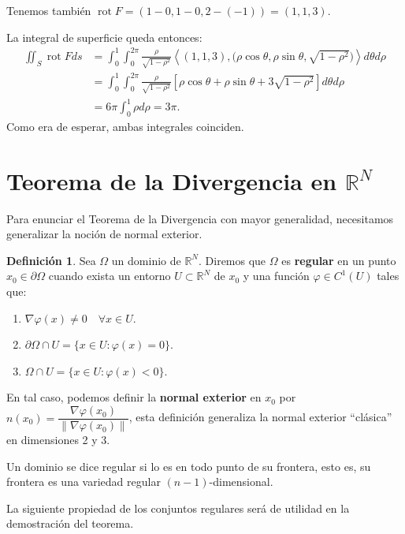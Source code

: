 \documentclass[12pt,spanish]{article}
\theoremstyle{definition}
\newtheorem{definition}[theorem]{Definici\'on}
\theoremstyle{remark}
\begin{document}
Tenemos también $\operatorname{rot} F=(1-0,1-0,2-(-1))=(1,1,3)$.

La integral de superficie queda entonces:
\begin{align*}
\iint_{S}\operatorname{rot} F ds&=\int_0^1\int_0^{2\pi}\frac{\rho}{\sqrt{1-\rho^2}}\left\langle(1,1,3),\big(\rho\cos \theta, \rho\sin\theta, \sqrt{1-\rho^2}\big)\right\rangle d\theta d\rho \\ 
&=\int_0^1\int_0^{2\pi}\frac{\rho}{\sqrt{1-\rho^2}}\left[\rho\cos\theta+\rho\sin\theta+3\sqrt{1-\rho^2} \right] d\theta d\rho \\
&= 6\pi\int_0^1 \rho d\rho=3\pi.
\end{align*}
Como era de esperar, ambas integrales coinciden.

\section{Teorema de la Divergencia en $\mathbb{R}^N$}

Para enunciar el Teorema de la Divergencia con mayor generalidad, necesitamos generalizar la noción de normal exterior. 

\begin{definition}
	Sea $\Omega$ un dominio de $\mathbb{R}^N$. Diremos que $\Omega$ es \textbf{regular} en un punto $x_0\in\partial\Omega$ cuando exista un entorno $U\subset\mathbb{R}^N$ de $x_0$ y una función $\varphi\in C^1(U)$ tales que:
	\begin{enumerate}[$(a)$]
		\item $\nabla \varphi(x)\neq 0\quad\forall x\in U$.
		\item $\partial\Omega\cap U=\{x\in U:\varphi(x)=0\}$.
		\item $\Omega\cap U=\{x\in U:\varphi(x)<0\}$.
	\end{enumerate}
En tal caso, podemos definir la \textbf{normal exterior} en $x_0$ por $n(x_0)=\dfrac{\nabla \varphi(x_0)}{\|\nabla \varphi(x_0)\|}$, esta definición generaliza la normal exterior ``clásica'' en dimensiones 2 y 3.

Un dominio se dice regular si lo es en todo punto de su frontera, esto es, su frontera es una variedad regular $(n-1)$-dimensional.
\end{definition}

La siguiente propiedad de los conjuntos regulares será de utilidad en la demostración del teorema.
\end{document}
